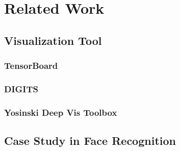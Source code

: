 
\chapter{Related Work}

\section{Visualization Tool}

\subsection{TensorBoard}

\subsection{DIGITS}

\subsection{Yosinski Deep Vis Toolbox}

\section{Case Study in Face Recognition}

\cleardoublepage